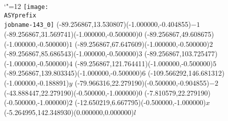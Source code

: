 \setlength{\unitlength}{1pt}%
\makeatletter%
\let\ASYencoding\f@encoding%
\let\ASYfamily\f@family%
\let\ASYseries\f@series%
\let\ASYshape\f@shape%
\makeatother%
{\catcode`"=12%
\texttt{[image: \\ASYprefix\\jobname-143\_0]}%
}%
\color{ASYcolor}%
\fontsize{12.000000}{14.400000}\selectfont%
\usefont{\ASYencoding}{\ASYfamily}{\ASYseries}{\ASYshape}%
\ASYalign(-89.256867,13.530807)(-1.000000,-0.404855){\vphantom{$10^4$}$-1$}%
\color{ASYcolor}%
\fontsize{12.000000}{14.400000}\selectfont%
\ASYalign(-89.256867,31.569741)(-1.000000,-0.500000){\vphantom{$10^4$}$0$}%
\color{ASYcolor}%
\fontsize{12.000000}{14.400000}\selectfont%
\ASYalign(-89.256867,49.608675)(-1.000000,-0.500000){\vphantom{$10^4$}$1$}%
\color{ASYcolor}%
\fontsize{12.000000}{14.400000}\selectfont%
\ASYalign(-89.256867,67.647609)(-1.000000,-0.500000){\vphantom{$10^4$}$2$}%
\color{ASYcolor}%
\fontsize{12.000000}{14.400000}\selectfont%
\ASYalign(-89.256867,85.686543)(-1.000000,-0.500000){\vphantom{$10^4$}$3$}%
\color{ASYcolor}%
\fontsize{12.000000}{14.400000}\selectfont%
\ASYalign(-89.256867,103.725477)(-1.000000,-0.500000){\vphantom{$10^4$}$4$}%
\color{ASYcolor}%
\fontsize{12.000000}{14.400000}\selectfont%
\ASYalign(-89.256867,121.764411)(-1.000000,-0.500000){\vphantom{$10^4$}$5$}%
\color{ASYcolor}%
\fontsize{12.000000}{14.400000}\selectfont%
\ASYalign(-89.256867,139.803345)(-1.000000,-0.500000){\vphantom{$10^4$}$6$}%
\color{ASYcolor}%
\fontsize{12.000000}{14.400000}\selectfont%
\ASYalign(-109.566292,146.681312)(-1.000000,-0.188891){$y$}%
\color{ASYcolor}%
\fontsize{12.000000}{14.400000}\selectfont%
\ASYalign(-79.966316,22.279190)(-0.500000,-0.904855){\vphantom{$10^4$}$-2$}%
\color{ASYcolor}%
\fontsize{12.000000}{14.400000}\selectfont%
\ASYalign(-43.888447,22.279190)(-0.500000,-1.000000){\vphantom{$10^4$}$0$}%
\color{ASYcolor}%
\fontsize{12.000000}{14.400000}\selectfont%
\ASYalign(-7.810579,22.279190)(-0.500000,-1.000000){\vphantom{$10^4$}$2$}%
\color{ASYcolor}%
\fontsize{12.000000}{14.400000}\selectfont%
\ASYalign(-12.650219,6.667795)(-0.500000,-1.000000){$x$}%
\color{ASYcolor}%
\fontsize{12.000000}{14.400000}\selectfont%
\ASYalign(-5.264995,142.348930)(0.000000,0.000000){$l$}%
